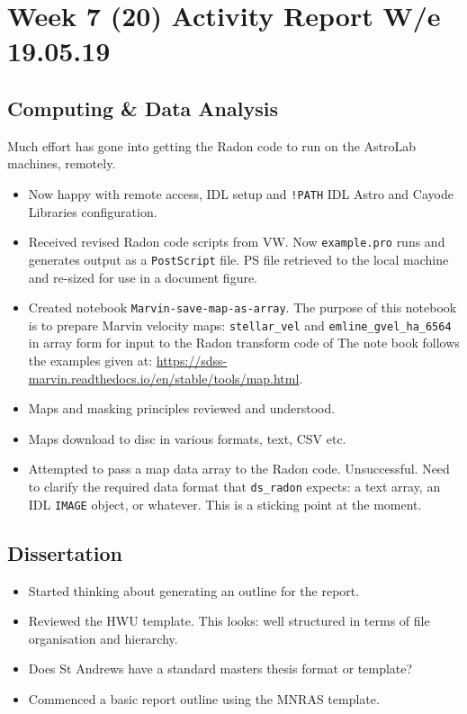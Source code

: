 \section{Week 7 (20) Activity Report W/e 19.05.19}

\subsection{Computing \& Data Analysis}
Much effort has gone into getting the Radon code to run on the AstroLab machines, remotely.
\begin{itemize}
    \item Now happy with remote access, IDL setup and \texttt{!PATH} IDL Astro and Cayode Libraries configuration. 
    \item Received revised Radon code scripts from VW. Now \texttt{example.pro} runs and generates output as a \texttt{PostScript} file. PS file retrieved to the local machine  and re-sized for use in a document figure. 
    \item Created notebook \texttt{Marvin-save-map-as-array}. The purpose of this notebook is to prepare Marvin velocity maps: \texttt{stellar\_vel} and \texttt{emline\_gvel\_ha\_6564} in array form for input to the Radon transform code of \citet{2018MNRAS.480.2217S} The note book follows the examples given at: \url{https://sdss-marvin.readthedocs.io/en/stable/tools/map.html}. 
    \item Maps and masking principles reviewed and understood.
    \item Maps download to disc in various formats, text, CSV etc.
    \item Attempted to pass a map data array to the Radon code. Unsuccessful. Need to clarify the required data format that \texttt{ds\_radon} expects: a text array, an IDL \texttt{IMAGE} object, or whatever. This is a sticking point at the moment.
\end{itemize}

\subsection{Dissertation}
\begin{itemize}
    \item Started thinking about generating an outline for the report.
    \item Reviewed the HWU template. This looks: well structured in terms of file organisation and hierarchy.
    \item Does St Andrews have a standard masters thesis format or template?
    \item Commenced a basic report outline using the MNRAS template.
\end{itemize}
